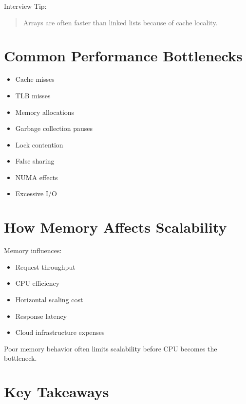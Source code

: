 Interview Tip:

\begin{quote}
Arrays are often faster than linked lists because of cache locality.
\end{quote}

\section{Common Performance Bottlenecks}

\begin{itemize}
\item Cache misses
\item TLB misses
\item Memory allocations
\item Garbage collection pauses
\item Lock contention
\item False sharing
\item NUMA effects
\item Excessive I/O
\end{itemize}

\section{How Memory Affects Scalability}

Memory influences:

\begin{itemize}
\item Request throughput
\item CPU efficiency
\item Horizontal scaling cost
\item Response latency
\item Cloud infrastructure expenses
\end{itemize}

Poor memory behavior often limits scalability before CPU becomes the bottleneck.

\section{Key Takeaways}

